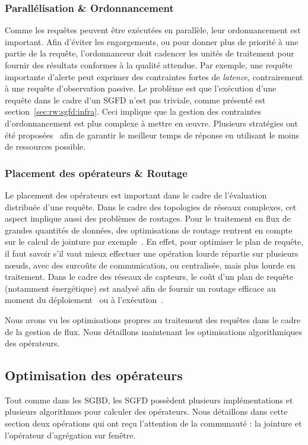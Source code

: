 \subsubsection{Parallélisation \& Ordonnancement}
Comme les requêtes peuvent être exécutées en parallèle, leur ordonnancement est important. Afin d'éviter les engorgements, ou pour donner plus de priorité à une partie de la requête, l'ordonnanceur doit cadencer les unités de traitement pour fournir des résultats conformes à la qualité attendue. Par exemple, une requête importante d'alerte peut exprimer des contraintes fortes de \textit{latence}, contrairement à une requête d'observation passive. Le problème est que l'exécution d'une requête dans le cadre d'un SGFD n'est pas triviale, comme présenté est section~\ref{sec:rw:sgfd:infra}. Ceci implique que la gestion des contraintes d'ordonnancement est plus complexe à mettre en œuvre. Plusieurs stratégies ont été proposées~\cite{Babcock:chain, Jiang:scheduling} afin de garantir le meilleur temps de réponse en utilisant le moins de ressources possible.

\subsubsection{Placement des opérateurs \& Routage}
Le placement des opérateurs est important dans le cadre de l'évaluation distribuée d'une requête. Dans le cadre des topologies de réseaux complexes, cet aspect implique aussi des problèmes de routages. Pour le traitement en flux de grandes quantités de données, des optimisations de routage rentrent en compte sur le calcul de jointure par exemple~\cite{Zhou:pmjoin, Palma:p2p}. En effet, pour optimiser le plan de requête, il faut savoir s'il vaut mieux effectuer une opération lourde répartie sur plusieurs nœuds, avec des surcoûts de communication, ou centralisée, mais plus lourde en traitement. Dans le cadre des réseaux de capteurs, le coût d'un plan de requête (notamment énergétique) est analysé afin de fournir un routage efficace au moment du déploiement~\cite{Galpin:snee} ou à l'exécution~\cite{Madden:tinydb}.

Nous avons vu les optimisations propres au traitement des requêtes dans le cadre de la gestion de flux. Nous détaillons maintenant les optimisations algorithmiques des opérateurs.

\subsection{Optimisation des opérateurs}
Tout comme dans les SGBD, les SGFD possèdent plusieurs implémentations et plusieurs algorithmes pour calculer des opérateurs. Nous détaillons dans cette section deux opérations qui ont reçu l'attention de la communauté : la jointure et l'opérateur d'agrégation sur fenêtre.


